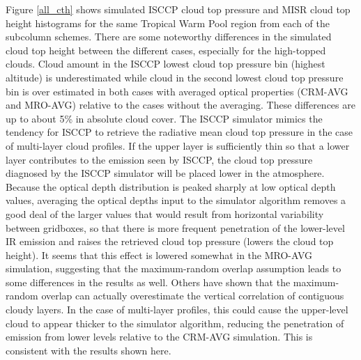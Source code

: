 \documentclass[letter]{article}
\begin{document}
Figure \ref{all_cth} shows simulated ISCCP cloud top pressure and MISR cloud top height histograms for the same Tropical Warm Pool region from each of the subcolumn schemes. There are some noteworthy differences in the simulated cloud top height between the different cases, especially for the high-topped clouds. Cloud amount in the ISCCP lowest cloud top pressure bin (highest altitude) is underestimated while cloud in the second lowest cloud top pressure bin is over estimated in both cases with averaged optical properties (CRM-AVG and MRO-AVG) relative to the cases without the averaging. These differences are up to about 5\% in absolute cloud cover. The ISCCP simulator mimics the tendency for ISCCP to retrieve the radiative mean cloud top pressure in the case of multi-layer cloud profiles. If the upper layer is sufficiently thin so that a lower layer contributes to the emission seen by ISCCP, the cloud top pressure diagnosed by the ISCCP simulator will be placed lower in the atmosphere. Because the optical depth distribution is peaked sharply at low optical depth values, averaging the optical depths input to the simulator algorithm removes a good deal of the larger values that would result from horizontal variability between gridboxes, so that there is more frequent penetration of the lower-level IR emission and raises the retrieved cloud top pressure (lowers the cloud top height). It seems that this effect is lowered somewhat in the MRO-AVG simulation, suggesting that the maximum-random overlap assumption leads to some differences in the results as well. Others have shown \citep[e.g.,][]{mace_and_benson-troth_2002} that the maximum-random overlap can actually overestimate the vertical correlation of contiguous cloudy layers. In the case of multi-layer profiles, this could cause the upper-level cloud to appear thicker to the simulator algorithm, reducing the penetration of emission from lower levels relative to the CRM-AVG simulation. This is consistent with the results shown here.
\end{document}
